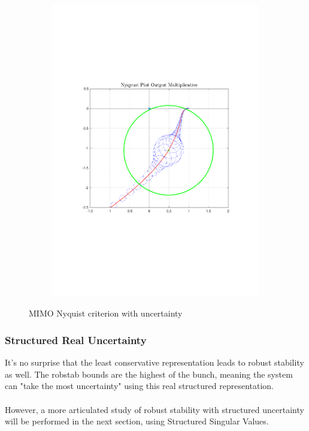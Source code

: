 \documentclass[a4paper, 12pt]{article}
\begin{document}
\begin{figure}[h!]{}
\begin{subfigure}[t]{0.32\textwidth}
    \includegraphics[width=\textwidth]{Figures/fig10c.pdf}
           \label{fig:fig10c}
    \end{subfigure}
    \caption{MIMO Nyquist criterion with uncertainty}
    \label{fig:fig10}
   \end{figure}
\clearpage
\subsubsection{Structured Real Uncertainty}
It's no surprise that the least conservative representation leads to robust stability as well. The robstab bounds are the highest of the bunch, meaning the system can "take the most uncertainty" using this real structured representation.
\\\\
However, a more articulated study of robust stability with structured uncertainty will be performed in the next section, using Structured Singular Values.
\end{document}
